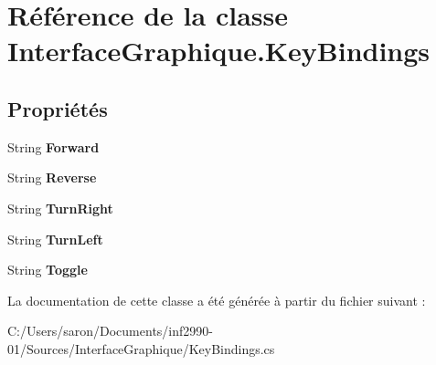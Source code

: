 \hypertarget{class_interface_graphique_1_1_key_bindings}{\section{Référence de la classe Interface\-Graphique.\-Key\-Bindings}
\label{class_interface_graphique_1_1_key_bindings}
}
\subsection*{Propriétés}
\begin{DoxyCompactItemize}
\item 
\hypertarget{class_interface_graphique_1_1_key_bindings_acfba3a6fd83fc49f186c52acdb2291df}{String {\bfseries Forward}}\label{class_interface_graphique_1_1_key_bindings_acfba3a6fd83fc49f186c52acdb2291df}

\item 
\hypertarget{class_interface_graphique_1_1_key_bindings_a6bb6e71fe377c5da46d56e9f3cc2dc64}{String {\bfseries Reverse}}\label{class_interface_graphique_1_1_key_bindings_a6bb6e71fe377c5da46d56e9f3cc2dc64}

\item 
\hypertarget{class_interface_graphique_1_1_key_bindings_a463af07de4227307c63e6a0b3265a6bc}{String {\bfseries Turn\-Right}}\label{class_interface_graphique_1_1_key_bindings_a463af07de4227307c63e6a0b3265a6bc}

\item 
\hypertarget{class_interface_graphique_1_1_key_bindings_a0520e1d4136842d65e21450d988fc5f3}{String {\bfseries Turn\-Left}}\label{class_interface_graphique_1_1_key_bindings_a0520e1d4136842d65e21450d988fc5f3}

\item 
\hypertarget{class_interface_graphique_1_1_key_bindings_abd885c126538991eea0db3efcd37ede6}{String {\bfseries Toggle}}\label{class_interface_graphique_1_1_key_bindings_abd885c126538991eea0db3efcd37ede6}

\end{DoxyCompactItemize}


La documentation de cette classe a été générée à partir du fichier suivant \-:\begin{DoxyCompactItemize}
\item 
C\-:/\-Users/saron/\-Documents/inf2990-\/01/\-Sources/\-Interface\-Graphique/Key\-Bindings.\-cs\end{DoxyCompactItemize}
